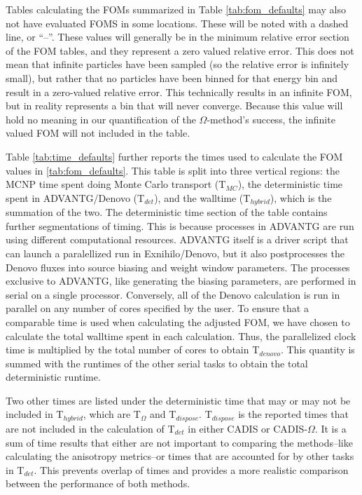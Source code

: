 Tables calculating the FOMs summarized in Table \ref{tab:fom_defaults} may also
not have evaluated FOMS in some locations. These will be noted with a dashed
line, or ``--''.  These values will generally be in the minimum relative error
section of the FOM tables, and they represent a zero valued relative error. This
does not mean that infinite particles have been sampled (so the relative error
is infinitely small), but rather that no particles have been binned for that
energy bin and result in a zero-valued relative error.
This technically results in an infinite FOM, but in reality
represents a bin that will never converge. Because this value will hold no
meaning in our quantification of the $\Omega$-method's success, the infinite
valued FOM will not included in the table.


Table \ref{tab:time_defaults} further reports the times used to calculate the
FOM values in \ref{tab:fom_defaults}. This table is split into three
vertical regions: the MCNP time spent doing Monte Carlo transport (T$_{MC}$),
the deterministic time spent in ADVANTG/Denovo (T$_{det}$),
and the walltime (T$_{hybrid}$), which is the
summation of the two. The deterministic time section of the table contains
further segmentations of timing. This is because processes in ADVANTG are
run using different computational resources. ADVANTG itself is a driver script
that can launch a paralellized run in Exnihilo/Denovo, but it also postprocesses the
Denovo fluxes into source biasing and weight window parameters. The processes
exclusive to ADVANTG, like generating the biasing parameters, are performed in
serial on a single processor. Conversely, all of the Denovo calculation is run
in parallel on any number of cores specified by the user. To ensure that a
comparable time is used when calculating the adjusted FOM, we have chosen to
calculate the total walltime spent in each calculation. Thus, the parallelized
clock time is multiplied by the total number of cores to obtain T$_{denovo}$.
This quantity is summed with
the runtimes of the other serial tasks to obtain the total deterministic runtime.

Two other times are listed under the deterministic time that may or may not be
included in T$_{hybrid}$, which are T$_{\Omega}$ and T$_{dispose}$. T$_{dispose}$ is the
reported times that are not included in the calculation of T$_{det}$ in either
CADIS or CADIS-$\Omega$. It is a sum of time results that either are not
important to comparing the methods--like calculating the anisotropy metrics--or
times that are accounted for by other tasks in T$_{det}$. This prevents overlap
of times and provides a more realistic comparison between the performance of
both methods.

